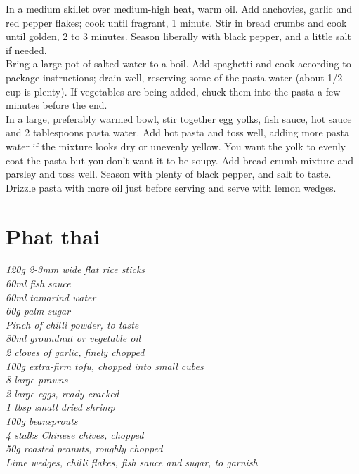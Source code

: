 \documentclass{tufte-book}
\begin{document}
In a medium skillet over medium-high heat, warm oil. Add anchovies, garlic and red pepper flakes; cook until fragrant, 1 minute. Stir in bread crumbs and cook until golden, 2 to 3 minutes. Season liberally with black pepper, and a little salt if needed.
\\Bring a large pot of salted water to a boil. Add spaghetti and cook according to package instructions; drain well, reserving some of the pasta water (about 1/2 cup is plenty). If vegetables are being added, chuck them into the pasta a few minutes before the end.
\\In a large, preferably warmed bowl, stir together egg yolks, fish sauce, hot sauce and 2 tablespoons pasta water. Add hot pasta and toss well, adding more pasta water if the mixture looks dry or unevenly yellow. You want the yolk to evenly coat the pasta but you don’t want it to be soupy. Add bread crumb mixture and parsley and toss well. Season with plenty of black pepper, and salt to taste. Drizzle pasta with more oil just before serving and serve with lemon wedges.


\section{Phat thai}

\emph{120g 2-3mm wide flat rice sticks
\\60ml fish sauce
\\60ml tamarind water
\\60g palm sugar
\\Pinch of chilli powder, to taste
\\80ml groundnut or vegetable oil
\\2 cloves of garlic, finely chopped
\\100g extra-firm tofu, chopped into small cubes
\\8 large prawns
\\2 large eggs, ready cracked
\\1 tbsp small dried shrimp
\\100g beansprouts
\\4 stalks Chinese chives, chopped
\\50g roasted peanuts, roughly chopped
\\Lime wedges, chilli flakes, fish sauce and sugar, to garnish}
\end{document}
